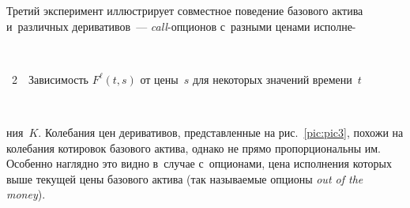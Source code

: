 \begin{multicols}{2}
Третий эксперимент иллюстрирует совместное поведение базового актива и~различных деривативов~--- \textit{call}-оп\-ци\-о\-нов 
с~раз\-ны\-ми ценами ис\-пол\-не-\linebreak\vspace*{-12pt}



{ \begin{center}  %
 \vspace*{-4pt}
    \mbox{%
\epsfxsize=78.561mm 
}

\end{center}



\noindent
{{\figurename~2}\ \ \small{Зависимость $F^{\ell}(t,s)$ от цены~$s$ для некоторых значений времени~$t$
}}}

\vspace*{6pt}


 
\setcounter{figure}{3}
 \begin{figure*} %
  \vspace*{1pt}
\begin{center}
   \mbox{%
\epsfxsize=162.931mm 
}
\end{center}
\vspace*{-12pt}
\label{pic:pic4}
\vspace*{-3pt}
\end{figure*}





\noindent
ния~$K$. Колебания цен деривативов, представлен\-ные на рис.~\ref{pic:pic3}, похожи на 
колебания котировок базового актива, однако не прямо пропорциональны им. Особенно на\-гляд\-но это вид\-но в~случае с~опционами, 
цена исполнения которых выше текущей цены базового актива (так на\-зы\-ва\-емые опционы \textit{out of the money}).


\end{multicols}
